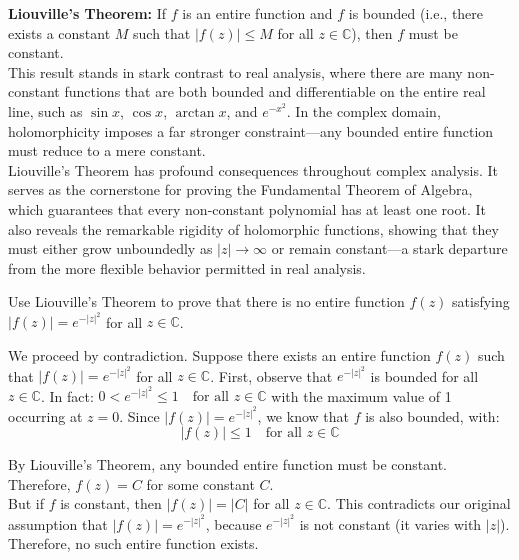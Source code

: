 \noindent \textbf{Liouville's Theorem:} If $f$ is an entire function and $f$ is bounded (i.e., there exists a constant $M$ such that $|f(z)| \leq M$ for all $z \in \mathbb{C}$), then $f$ must be constant. \\

\noindent This result stands in stark contrast to real analysis, where there are many non-constant functions that are both bounded and differentiable on the entire real line, such as $\sin x$, $\cos x$, $\arctan x$, and $e^{-x^2}$. In the complex domain, holomorphicity imposes a far stronger constraint—any bounded entire function must reduce to a mere constant. \\

\noindent Liouville's Theorem has profound consequences throughout complex analysis. It serves as the cornerstone for proving the Fundamental Theorem of Algebra, which guarantees that every non-constant polynomial has at least one root. It also reveals the remarkable rigidity of holomorphic functions, showing that they must either grow unboundedly as $|z| \to \infty$ or remain constant—a stark departure from the more flexible behavior permitted in real analysis.


\exampleline
\begin{example}
Use Liouville's Theorem to prove that there is no entire function $f(z)$ satisfying $|f(z)| = e^{-|z|^2}$ for all $z \in \mathbb{C}$.

\begin{solution}
\noindent We proceed by contradiction. Suppose there exists an entire function $f(z)$ such that $|f(z)| = e^{-|z|^2}$ for all $z \in \mathbb{C}$. First, observe that $e^{-|z|^2}$ is bounded for all $z \in \mathbb{C}$. In fact: \( 0 < e^{-|z|^2} \leq 1 \quad \text{for all } z \in \mathbb{C} \) with the maximum value of 1 occurring at $z = 0$. Since $|f(z)| = e^{-|z|^2}$, we know that $f$ is also bounded, with:
\[
|f(z)| \leq 1 \quad \text{for all } z \in \mathbb{C}
\]

\noindent By Liouville's Theorem, any bounded entire function must be constant. Therefore, $f(z) = C$ for some constant $C$. \\

\noindent But if $f$ is constant, then $|f(z)| = |C|$ for all $z \in \mathbb{C}$. This contradicts our original assumption that $|f(z)| = e^{-|z|^2}$, because $e^{-|z|^2}$ is not constant (it varies with $|z|$). Therefore, no such entire function exists.
\end{solution}
\end{example}
\exampleline


